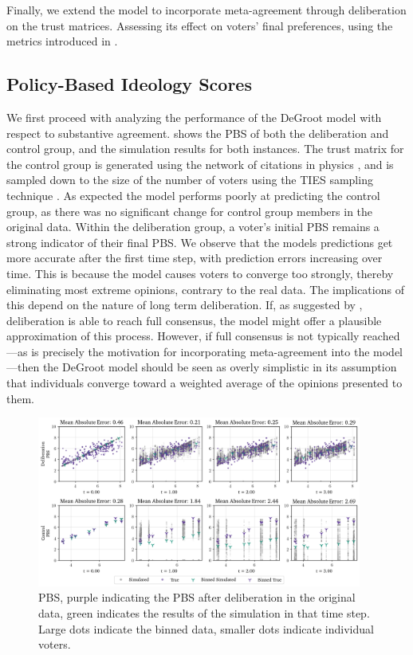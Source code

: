 Finally, we extend the model to incorporate meta-agreement through deliberation
on the trust matrices. Assessing its effect on voters’ final preferences, using
the metrics introduced in .

\subsection{Policy-Based Ideology Scores}

We first proceed with analyzing the performance of the DeGroot model with
respect to substantive agreement.  shows the PBS of both the
deliberation and control group, and the simulation results for both instances.
The trust matrix for the control group is generated using the network of
citations in physics \cite{nr}, and is sampled down to the size of the number
of voters using the TIES sampling technique
\cite{ahmedNetworkSamplingStatic2013}. As expected the model performs poorly at
predicting the control group, as there was no significant change for control
group members in the original data. Within the deliberation group, a voter's
initial PBS remains a strong indicator of their final PBS. We observe that the
models predictions get more accurate after the first time step, with prediction
errors increasing over time. This is because the model causes voters to
converge too strongly, thereby eliminating most extreme opinions, contrary to
the real data. The implications of this depend on the nature of long term
deliberation. If, as suggested by \citet{elsterMarketForumThree2002},
deliberation is able to reach full consensus, the model might offer a plausible
approximation of this process. However, if full consensus is not typically
reached—as is precisely the motivation for incorporating meta-agreement into
the model—then the DeGroot model should be seen as overly simplistic in its
assumption that individuals converge toward a weighted average of the opinions
presented to them.

\begin{figure}[ht]
	\begin{center}
		\includegraphics[width=0.95\textwidth]{Figures/pbs_scores.png}
	\end{center}
	\caption{ PBS, purple indicating the PBS after deliberation in the original data, green indicates the results of the simulation in that time step. Large dots indicate the binned data, smaller dots indicate individual voters.}\label{fig:pbs}
\end{figure}

